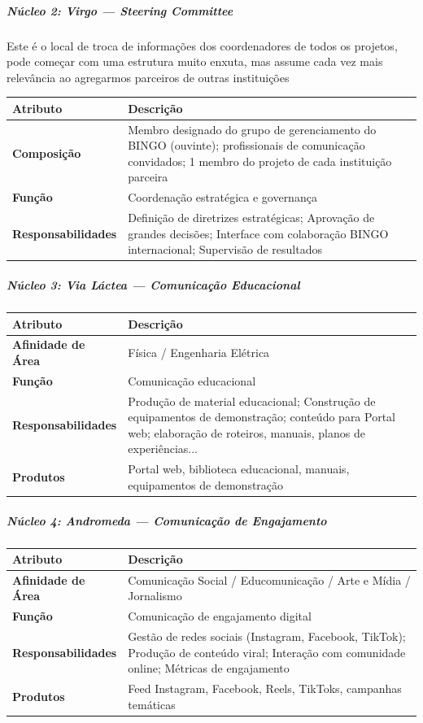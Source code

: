 \bigskip

\subparagraph{Núcleo 2: Virgo --- Steering Committee}

Este é o local de troca de informações dos coordenadores de todos os projetos, pode começar com uma estrutura muito enxuta, mas assume cada vez mais relevância ao agregarmos parceiros de outras instituições

\bigskip\noindent
\begin{tabular}{p{}p{}}
\toprule
Atributo & Descrição \\
\hline
\textbf{Composição} & Membro designado do grupo de gerenciamento do BINGO (ouvinte); profissionais de comunicação convidados; 1 membro do projeto de cada instituição parceira \\
\textbf{Função} & Coordenação estratégica e governança \\
\textbf{Responsabilidades} & Definição de diretrizes estratégicas; Aprovação de grandes decisões; Interface com colaboração BINGO internacional; Supervisão de resultados \\
\bottomrule
\end{tabular}

\bigskip

\subparagraph{Núcleo 3: Via Láctea --- Comunicação Educacional}

\bigskip\noindent
\begin{tabular}{p{}p{}}
\toprule
Atributo & Descrição \\
\hline
\textbf{Afinidade de Área} & Física / Engenharia Elétrica \\
\textbf{Função} & Comunicação educacional \\
\textbf{Responsabilidades} & Produção de material educacional; Construção de equipamentos de demonstração; conteúdo para Portal web; elaboração de roteiros, manuais, planos de experiências... \\
\textbf{Produtos} & Portal web, biblioteca educacional, manuais, equipamentos de demonstração \\
\bottomrule
\end{tabular}

\bigskip

\subparagraph{Núcleo 4: Andromeda --- Comunicação de Engajamento}

\bigskip\noindent
\begin{tabular}{p{}p{}}
\toprule
Atributo & Descrição \\
\hline
\textbf{Afinidade de Área} & Comunicação Social / Educomunicação / Arte e Mídia / Jornalismo \\
\textbf{Função} & Comunicação de engajamento digital \\
\textbf{Responsabilidades} & Gestão de redes sociais (Instagram, Facebook, TikTok); Produção de conteúdo viral; Interação com comunidade online; Métricas de engajamento \\
\textbf{Produtos} & Feed Instagram, Facebook, Reels, TikToks, campanhas temáticas \\
\bottomrule
\end{tabular}

